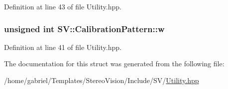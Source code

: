 Definition at line 43 of file Utility.\-hpp.

\hypertarget{struct_s_v_1_1_calibration_pattern_a99b723ddb247ba8a45bbae90f72992ee}{
\subsubsection[{w}]{\setlength{\rightskip}{0pt plus 5cm}unsigned int S\-V\-::\-Calibration\-Pattern\-::w}}\label{struct_s_v_1_1_calibration_pattern_a99b723ddb247ba8a45bbae90f72992ee}


Definition at line 41 of file Utility.\-hpp.



The documentation for this struct was generated from the following file\-:\begin{DoxyCompactItemize}
\item 
/home/gabriel/\-Templates/\-Stereo\-Vision/\-Include/\-S\-V/\hyperlink{_utility_8hpp}{Utility.\-hpp}\end{DoxyCompactItemize}

